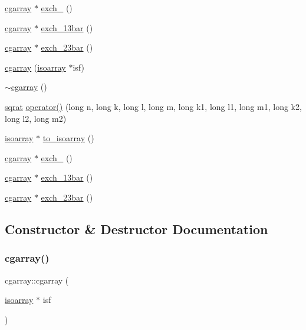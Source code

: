 \begin{DoxyCompactItemize}
\item 
\mbox{\hyperlink{classcgarray}{cgarray}} $\ast$ \mbox{\hyperlink{classcgarray_a86ce4d7c72cddf62047e018d1199df8c}{exch\+\_}} ()
\item 
\mbox{\hyperlink{classcgarray}{cgarray}} $\ast$ \mbox{\hyperlink{classcgarray_af08670dc7c69194e4f7ace902daac0bf}{exch\+\_\+13bar}} ()
\item 
\mbox{\hyperlink{classcgarray}{cgarray}} $\ast$ \mbox{\hyperlink{classcgarray_a076528ed9996913e7017e81be6384a85}{exch\+\_\+23bar}} ()
\item 
\mbox{\hyperlink{classcgarray_a0a9d804cf3256428f8d8937749a8b776}{cgarray}} (\mbox{\hyperlink{classisoarray}{isoarray}} $\ast$isf)
\item 
\mbox{\hyperlink{classcgarray_af332defc2438028410ad8e2ae98aa848}{$\sim$cgarray}} ()
\item 
\mbox{\hyperlink{classsqrat}{sqrat}} \mbox{\hyperlink{classcgarray_ad55c1e537d3070a732d9355ed351d53e}{operator()}} (long n, long k, long l, long m, long k1, long l1, long m1, long k2, long l2, long m2)
\item 
\mbox{\hyperlink{classisoarray}{isoarray}} $\ast$ \mbox{\hyperlink{classcgarray_ade5be135cf4078de471bfb31497b0efa}{to\+\_\+isoarray}} ()
\item 
\mbox{\hyperlink{classcgarray}{cgarray}} $\ast$ \mbox{\hyperlink{classcgarray_a86ce4d7c72cddf62047e018d1199df8c}{exch\+\_}} ()
\item 
\mbox{\hyperlink{classcgarray}{cgarray}} $\ast$ \mbox{\hyperlink{classcgarray_af08670dc7c69194e4f7ace902daac0bf}{exch\+\_\+13bar}} ()
\item 
\mbox{\hyperlink{classcgarray}{cgarray}} $\ast$ \mbox{\hyperlink{classcgarray_a076528ed9996913e7017e81be6384a85}{exch\+\_\+23bar}} ()
\end{DoxyCompactItemize}


\subsection{Constructor \& Destructor Documentation}
\mbox{\label{classcgarray_a0a9d804cf3256428f8d8937749a8b776}} 
\subsubsection{\texorpdfstring{cgarray()}{cgarray()}\hspace{0.1cm}{\footnotesize\ttfamily [1/3]}}
{\footnotesize\ttfamily cgarray\+::cgarray (\begin{DoxyParamCaption}\item[{\mbox{\hyperlink{classisoarray}{isoarray}} $\ast$}]{isf }\end{DoxyParamCaption})}

